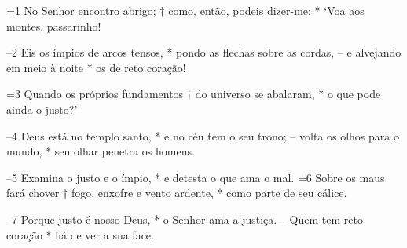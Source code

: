 =1 No Senhor encontro abrigo; † 
 como, então, podeis dizer-me: * 
 ‘Voa aos montes, passarinho! 

 –2 Eis os ímpios de arcos tensos, * 
 pondo as flechas sobre as cordas, 
 – e alvejando em meio à noite * 
 os de reto coração! 

 =3 Quando os próprios fundamentos † 
 do universo se abalaram, * 
 o que pode ainda o justo?’ 

 –4 Deus está no templo santo, * 
 e no céu tem o seu trono; 
 – volta os olhos para o mundo, * 
 seu olhar penetra os homens. 

 –5 Examina o justo e o ímpio, * 
 e detesta o que ama o mal. 
 =6 Sobre os maus fará chover † 
 fogo, enxofre e vento ardente, * 
 como parte de seu cálice. 

 –7 Porque justo é nosso Deus, * 
 o Senhor ama a justiça. 
 – Quem tem reto coração * 
 há de ver a sua face.